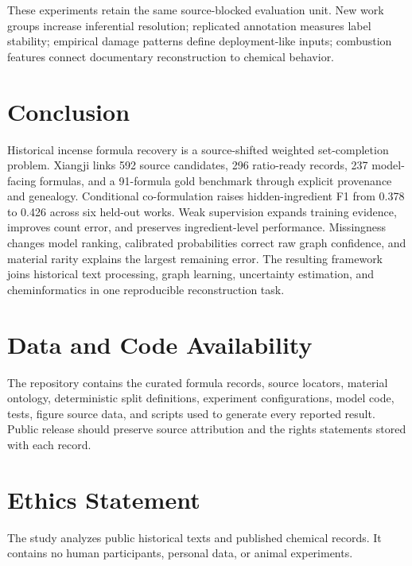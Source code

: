 \documentclass[11pt,a4paper]{article}
\begin{document}
These experiments retain the same source-blocked evaluation unit. New work groups increase inferential resolution; replicated annotation measures label stability; empirical damage patterns define deployment-like inputs; combustion features connect documentary reconstruction to chemical behavior.

\section{Conclusion}

Historical incense formula recovery is a source-shifted weighted set-completion problem. Xiangji links 592 source candidates, 296 ratio-ready records, 237 model-facing formulas, and a 91-formula gold benchmark through explicit provenance and genealogy. Conditional co-formulation raises hidden-ingredient F1 from 0.378 to 0.426 across six held-out works. Weak supervision expands training evidence, improves count error, and preserves ingredient-level performance. Missingness changes model ranking, calibrated probabilities correct raw graph confidence, and material rarity explains the largest remaining error. The resulting framework joins historical text processing, graph learning, uncertainty estimation, and cheminformatics in one reproducible reconstruction task.

\section*{Data and Code Availability}

The repository contains the curated formula records, source locators, material ontology, deterministic split definitions, experiment configurations, model code, tests, figure source data, and scripts used to generate every reported result. Public release should preserve source attribution and the rights statements stored with each record.

\section*{Ethics Statement}

The study analyzes public historical texts and published chemical records. It contains no human participants, personal data, or animal experiments.



\end{document}
